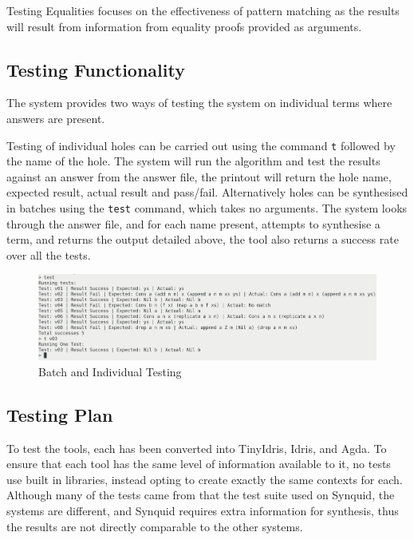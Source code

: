 \documentclass[a4paper]{article}
\begin{document}
Testing Equalities focuses on the effectiveness of pattern matching
as the results will result from information from equality proofs provided
as arguments. 


\subsection{Testing Functionality}

The system provides two ways of testing the system on individual terms
where answers are present. 

Testing of individual holes can be carried out using the 
command \texttt{t} followed by the name of the hole. The system
will run the algorithm and test the results against an answer from
the answer file, the printout will return the hole name, expected result,
actual result and pass/fail. Alternatively holes can be synthesised in 
batches using the \texttt{test} command, which takes no arguments.
The system looks through the answer file, and for each name present,
attempts to synthesise a term, and returns the output detailed above,
the tool also returns a success rate over all the tests. 

\begin{center}
\begin{figure}[htbp]
\centering
\includegraphics[scale=0.20]{./Resource/batch-test.png}
\caption{Batch and Individual Testing}
\end{figure}
\end{center}


\subsection{Testing Plan}

To test the tools, each has been converted into TinyIdris,
Idris, and Agda. To ensure that each tool has the same level
of information available to it, no tests use built in libraries,
instead opting to create exactly the same contexts for each.
Although many of the tests came from that the test suite used on
Synquid, the systems are different, and Synquid requires extra
information for synthesis, thus the results are not directly
comparable to the other systems.
\end{document}
